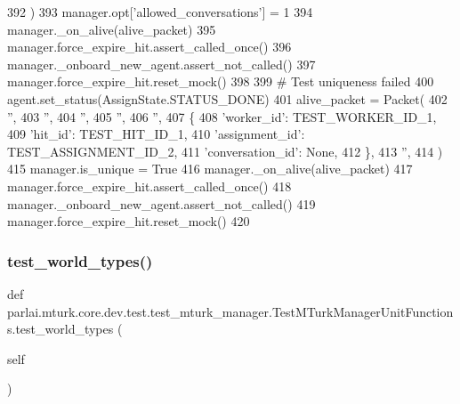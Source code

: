 \begin{DoxyCode}
392         )
393         manager.opt[\textcolor{stringliteral}{'allowed\_conversations'}] = 1
394         manager.\_on\_alive(alive\_packet)
395         manager.force\_expire\_hit.assert\_called\_once()
396         manager.\_onboard\_new\_agent.assert\_not\_called()
397         manager.force\_expire\_hit.reset\_mock()
398 
399         \textcolor{comment}{# Test uniqueness failed}
400         agent.set\_status(AssignState.STATUS\_DONE)
401         alive\_packet = Packet(
402             \textcolor{stringliteral}{''},
403             \textcolor{stringliteral}{''},
404             \textcolor{stringliteral}{''},
405             \textcolor{stringliteral}{''},
406             \textcolor{stringliteral}{''},
407             \{
408                 \textcolor{stringliteral}{'worker\_id'}: TEST\_WORKER\_ID\_1,
409                 \textcolor{stringliteral}{'hit\_id'}: TEST\_HIT\_ID\_1,
410                 \textcolor{stringliteral}{'assignment\_id'}: TEST\_ASSIGNMENT\_ID\_2,
411                 \textcolor{stringliteral}{'conversation\_id'}: \textcolor{keywordtype}{None},
412             \},
413             \textcolor{stringliteral}{''},
414         )
415         manager.is\_unique = \textcolor{keyword}{True}
416         manager.\_on\_alive(alive\_packet)
417         manager.force\_expire\_hit.assert\_called\_once()
418         manager.\_onboard\_new\_agent.assert\_not\_called()
419         manager.force\_expire\_hit.reset\_mock()
420 
\end{DoxyCode}
\mbox{\label{classparlai_1_1mturk_1_1core_1_1dev_1_1test_1_1test__mturk__manager_1_1TestMTurkManagerUnitFunctions_aafa25792d9c1368be3f2df182a6109f1}} 
\subsubsection{\texorpdfstring{test\+\_\+world\+\_\+types()}{test\_world\_types()}}
{\footnotesize\ttfamily def parlai.\+mturk.\+core.\+dev.\+test.\+test\+\_\+mturk\+\_\+manager.\+Test\+M\+Turk\+Manager\+Unit\+Functions.\+test\+\_\+world\+\_\+types (\begin{DoxyParamCaption}\item[{}]{self }\end{DoxyParamCaption})}



